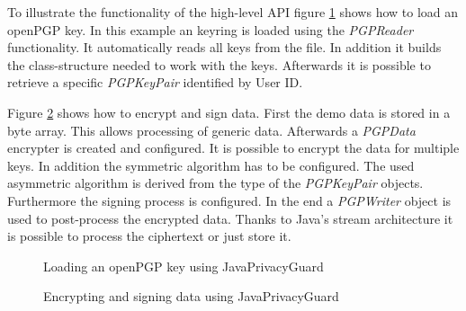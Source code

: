 To illustrate the functionality of the high-level API figure \ref{fig:jpg:key} shows how to load an openPGP key. In this example an keyring is loaded using the \textit{PGPReader} functionality. It automatically reads all keys from the file. In addition it builds the class-structure needed to work with the keys. Afterwards it is possible to retrieve a specific \textit{PGPKeyPair} identified by User ID.

Figure \ref{fig:jpg:enc} shows how to encrypt and sign data. First the demo data is stored in a byte array. This allows processing of generic data. Afterwards a \textit{PGPData} encrypter is created and configured. It is possible to encrypt the data for multiple keys. In addition the symmetric algorithm has to be configured. The used asymmetric algorithm is derived from the type of the \textit{PGPKeyPair} objects. Furthermore the signing process is configured.  In the end a \textit{PGPWriter} object is used to post-process the encrypted data. Thanks to Java's stream architecture it is possible to process the ciphertext or just store it.

\begin{figure}[p]
	\centering
	
	\caption{Loading an openPGP key using JavaPrivacyGuard}
	\label{fig:jpg:key}
\end{figure}

\begin{figure}[p]
	\centering
	
	\caption{Encrypting and signing data using JavaPrivacyGuard}
	\label{fig:jpg:enc}
\end{figure}

%
%
%
%
%
%


